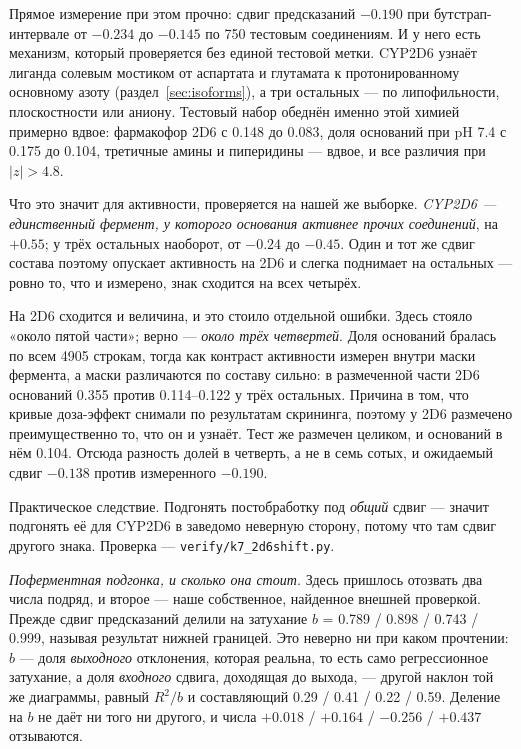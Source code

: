 Прямое измерение при этом прочно: сдвиг предсказаний $-0.190$ при бутстрап-интервале от
$-0.234$ до $-0.145$ по 750 тестовым соединениям. И у него есть механизм, который проверяется
без единой тестовой метки. CYP2D6 узнаёт лиганда солевым мостиком от аспартата и глутамата к
протонированному основному азоту (раздел~\ref{sec:isoforms}), а три остальных --- по
липофильности, плоскостности или аниону. Тестовый набор обеднён именно этой химией примерно
вдвое: фармакофор 2D6 с 0.148 до 0.083, доля оснований при pH 7.4 с 0.175 до 0.104,
третичные амины и пиперидины --- вдвое, и все различия при $|z| > 4.8$.

Что это значит для активности, проверяется на нашей же выборке. \emph{CYP2D6 --- единственный
фермент, у которого основания активнее прочих соединений}, на $+0.55$; у трёх остальных
наоборот, от $-0.24$ до $-0.45$. Один и тот же сдвиг состава поэтому опускает активность на
2D6 и слегка поднимает на остальных --- ровно то, что и измерено, знак сходится на всех
четырёх.

На 2D6 сходится и величина, и это стоило отдельной ошибки. Здесь стояло «около пятой части»;
верно --- \emph{около трёх четвертей}. Доля оснований бралась по всем 4905 строкам, тогда как
контраст активности измерен внутри маски фермента, а маски различаются по составу сильно:
в размеченной части 2D6 оснований 0.355 против 0.114--0.122 у трёх остальных. Причина в том,
что кривые доза-эффект снимали по результатам скрининга, поэтому у 2D6 размечено
преимущественно то, что он и узнаёт. Тест же размечен целиком, и оснований в нём 0.104.
Отсюда разность долей в четверть, а не в семь сотых, и ожидаемый сдвиг $-0.138$ против
измеренного $-0.190$.

Практическое следствие. Подгонять постобработку под \emph{общий} сдвиг --- значит подгонять
её для CYP2D6 в заведомо неверную сторону, потому что там сдвиг другого знака. Проверка ---
\texttt{verify/k7\_2d6shift.py}.

\emph{Поферментная подгонка, и сколько она стоит.} Здесь пришлось отозвать два числа
подряд, и второе --- наше собственное, найденное внешней проверкой. Прежде сдвиг предсказаний делили на затухание
$b$ = 0.789 / 0.898 / 0.743 / 0.999, называя результат нижней границей. Это неверно ни при
каком прочтении: $b$ --- доля \emph{выходного} отклонения, которая реальна, то есть само
регрессионное затухание, а доля \emph{входного} сдвига, доходящая до выхода, --- другой наклон
той же диаграммы, равный $R^2/b$ и составляющий 0.29 / 0.41 / 0.22 / 0.59. Деление на $b$ не
даёт ни того ни другого, и числа $+0.018$ / $+0.164$ / $-0.256$ / $+0.437$ отзываются.

